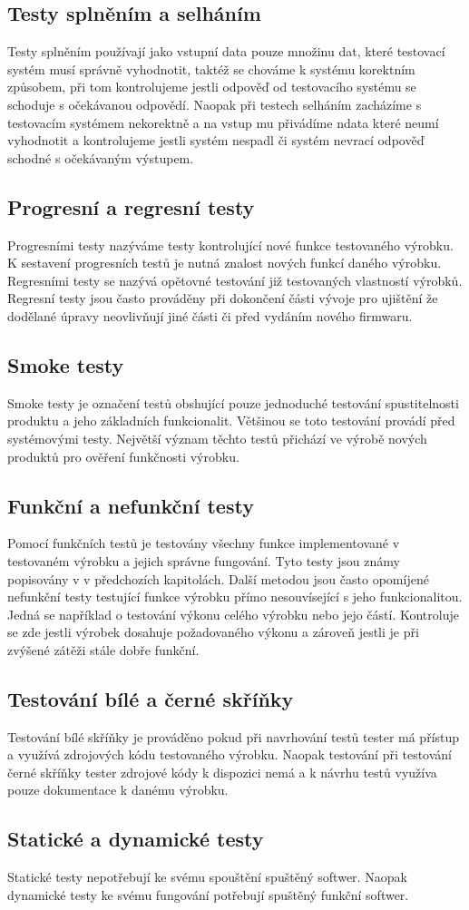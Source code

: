 \subsection{Testy splněním a selháním}
Testy splněním používají jako vstupní data pouze množinu dat, které testovací systém musí správně vyhodnotit, taktéž se chováme k systému korektním způsobem, při tom kontrolujeme jestli odpověď od testovacího systému se schoduje s očekávanou odpovědí. Naopak při testech selháním zacházíme s testovacím systémem nekorektně a na vstup mu přivádíme ndata které neumí vyhodnotit a kontrolujeme jestli systém nespadl či systém nevrací odpověď schodné s očekávaným výstupem.

\subsection{Progresní a regresní testy}
Progresními testy nazýváme testy kontrolující nové funkce testovaného výrobku. K sestavení progresních testů je nutná znalost nových funkcí daného výrobku. Regresními testy se nazývá opětovné testování již testovaných vlastností výrobků. Regresní testy jsou často prováděny při dokončení části vývoje pro ujištění že dodělané úpravy neovlivňují jiné části či před vydáním nového firmwaru.

\subsection{Smoke testy}
Smoke testy je označení testů obshující pouze jednoduché testování spustitelnosti produktu a jeho základních funkcionalit. Většinou se toto testování provádí před systémovými testy. Největší význam těchto testů přichází ve výrobě nových produktů pro ověření funkčnosti výrobku.

\subsection{Funkční a nefunkční testy}
Pomocí funkčních testů je testovány všechny funkce implementované v testovaném výrobku a jejich správne fungování. Tyto testy jsou známy popisovány v v předchozích kapitolách. Další metodou jsou často opomíjené nefunkční testy testující funkce výrobku přímo nesouvísející s jeho funkcionalitou. Jedná se například o testování výkonu celého výrobku nebo jejo částí. Kontroluje se zde jestli výrobek dosahuje požadovaného výkonu a zároveň jestli je při zvýšené zátěži stále dobře funkční.

\subsection{Testování bílé a černé skříňky}
Testování bílé skříňky je prováděno pokud při navrhování testů tester má přístup a využívá zdrojových kódu testovaného výrobku. Naopak testování při testování černé skříňky tester zdrojové kódy k dispozici nemá a k návrhu testů využíva pouze dokumentace k danému výrobku.


\subsection{Statické a dynamické testy}
Statické testy nepotřebují ke svému spouštění spuštěný softwer. Naopak dynamické testy ke svému fungování potřebují spuštěný funkční softwer.


\endinput
